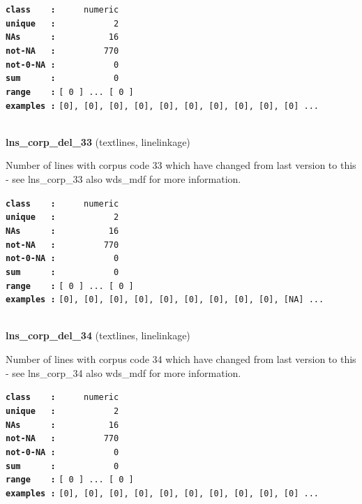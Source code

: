\documentclass[]{article}
\begin{document}
\textbf{\texttt{class\ \ \ \ :}} \texttt{~~~~~numeric}\\
\textbf{\texttt{unique\ \ \ :}} \texttt{~~~~~~~~~~~2}\\
\textbf{\texttt{NAs\ \ \ \ \ \ :}} \texttt{~~~~~~~~~~16}\\
\textbf{\texttt{not-NA\ \ \ :}} \texttt{~~~~~~~~~770}\\
\textbf{\texttt{not-0-NA\ :}} \texttt{~~~~~~~~~~~0}\\
\textbf{\texttt{sum\ \ \ \ \ \ :}} \texttt{~~~~~~~~~~~0}\\
\textbf{\texttt{range\ \ \ \ :}}
\texttt{{[}\ 0\ {]}\ ...\ {[}\ 0\ {]}}\\
\textbf{\texttt{examples\ :}}
\texttt{{[}0{]},\ {[}0{]},\ {[}0{]},\ {[}0{]},\ {[}0{]},\ {[}0{]},\ {[}0{]},\ {[}0{]},\ {[}0{]},\ {[}0{]}\ ...}\\

~

\textbf{lns\_corp\_del\_33} (textlines, linelinkage)

Number of lines with corpus code 33 which have changed from last version
to this - see lns\_corp\_33 also wds\_mdf for more information.

\textbf{\texttt{class\ \ \ \ :}} \texttt{~~~~~numeric}\\
\textbf{\texttt{unique\ \ \ :}} \texttt{~~~~~~~~~~~2}\\
\textbf{\texttt{NAs\ \ \ \ \ \ :}} \texttt{~~~~~~~~~~16}\\
\textbf{\texttt{not-NA\ \ \ :}} \texttt{~~~~~~~~~770}\\
\textbf{\texttt{not-0-NA\ :}} \texttt{~~~~~~~~~~~0}\\
\textbf{\texttt{sum\ \ \ \ \ \ :}} \texttt{~~~~~~~~~~~0}\\
\textbf{\texttt{range\ \ \ \ :}}
\texttt{{[}\ 0\ {]}\ ...\ {[}\ 0\ {]}}\\
\textbf{\texttt{examples\ :}}
\texttt{{[}0{]},\ {[}0{]},\ {[}0{]},\ {[}0{]},\ {[}0{]},\ {[}0{]},\ {[}0{]},\ {[}0{]},\ {[}0{]},\ {[}NA{]}\ ...}\\

~

\textbf{lns\_corp\_del\_34} (textlines, linelinkage)

Number of lines with corpus code 34 which have changed from last version
to this - see lns\_corp\_34 also wds\_mdf for more information.

\textbf{\texttt{class\ \ \ \ :}} \texttt{~~~~~numeric}\\
\textbf{\texttt{unique\ \ \ :}} \texttt{~~~~~~~~~~~2}\\
\textbf{\texttt{NAs\ \ \ \ \ \ :}} \texttt{~~~~~~~~~~16}\\
\textbf{\texttt{not-NA\ \ \ :}} \texttt{~~~~~~~~~770}\\
\textbf{\texttt{not-0-NA\ :}} \texttt{~~~~~~~~~~~0}\\
\textbf{\texttt{sum\ \ \ \ \ \ :}} \texttt{~~~~~~~~~~~0}\\
\textbf{\texttt{range\ \ \ \ :}}
\texttt{{[}\ 0\ {]}\ ...\ {[}\ 0\ {]}}\\
\textbf{\texttt{examples\ :}}
\texttt{{[}0{]},\ {[}0{]},\ {[}0{]},\ {[}0{]},\ {[}0{]},\ {[}0{]},\ {[}0{]},\ {[}0{]},\ {[}0{]},\ {[}0{]}\ ...}\\
\end{document}

